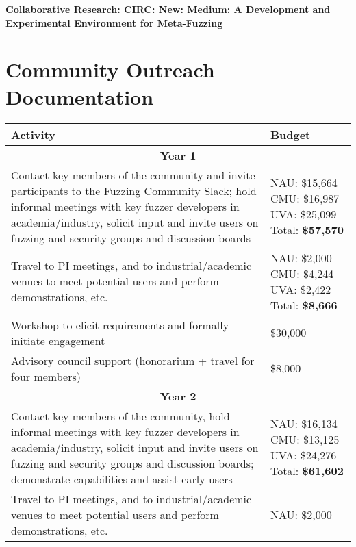 \documentclass[12pt]{article}
\begin{document}
\begin{center} {\Large\sf\textbf{Collaborative Research: CIRC: New: Medium: A
      Development and Experimental Environment for Meta-Fuzzing}}
\end{center}

\section*{Community Outreach Documentation}


\begin{table}
  \begin{tabular}{|p{12cm}|p{3cm}|}
    \hline
    {\bf Activity} & {\bf Budget} \\
    \hline 
    \multicolumn{2}{c}{{\bf Year 1}} \\
    \hline
    Contact key members of the community and invite participants to the
    Fuzzing Community Slack; hold informal meetings with
    key fuzzer developers in academia/industry, solicit input and
    invite users
    on fuzzing and security groups and discussion boards &  NAU: \$15,664 CMU: \$16,987 UVA: \$25,099
                                                      Total: \textbf{\$57,570} \\
    \hline
    Travel to PI meetings, and to industrial/academic venues to meet
    potential users and perform demonstrations, etc. & NAU: \$2,000
                                                       CMU: \$4,244 UVA:
                                                       \$2,422 Total: \textbf{\$8,666}\\
    \hline
    Workshop to elicit requirements and formally initiate engagement
& \$30,000 \\
    \hline 
    Advisory council support (honorarium + travel for four members) 
  & \$8,000 \\
    \hline
    \hline
    \multicolumn{2}{c}{{\bf Year 2}} \\
    \hline
    \hline
    Contact key members of the community, hold informal meetings with
    key fuzzer developers in academia/industry, solicit input and
    invite users
    on fuzzing and security groups and discussion boards; demonstrate
    capabilities and assist early users&  NAU:  \$16,134 CMU:  \$13,125 UVA: \$24,276
                                                      Total: \textbf{\$61,602}  \\
    \hline
    Travel to PI meetings, and to industrial/academic venues to meet
    potential users and perform demonstrations, etc. & NAU: \$2,000

\end{tabular}
\end{table}
\end{document}
